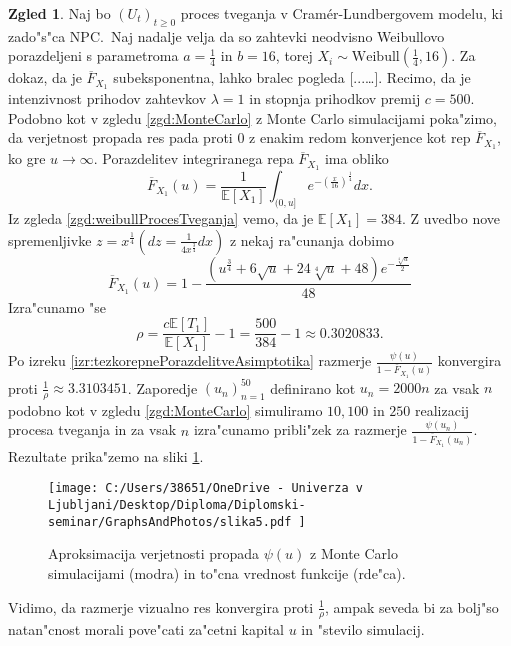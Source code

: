 \documentclass[12pt, a4paper, reqno]{amsart}
\theoremstyle{definition}
\newtheorem{zgled}[definicija]{Zgled}
\theoremstyle{plain}
\newcommand{\E}{\mathbb{E}}
\newcommand{\1}{\mathds{1}}
\begin{document}
        \begin{zgled}
        Naj bo $(U_t)_{t\geq0}$ proces tveganja v Cramér-Lundbergovem modelu, ki zado"s"ca NPC.\ Naj 
        nadalje velja da so zahtevki neodvisno Weibullovo porazdeljeni s parametroma
        $a= \frac{1}{4}$ in $b= 16$, torej $X_i\sim\text{Weibull}(\frac{1}{4}, 16)$. 
        Za dokaz, da je $\overline{F}_{X_1}$ subeksponentna, lahko bralec pogleda [...\dots].
        Recimo, da je intenzivnost 
        prihodov zahtevkov $\lambda = 1$ in stopnja prihodkov premij $c = 500$.
        Podobno kot v zgledu \ref{zgd:MonteCarlo} z Monte Carlo simulacijami poka"zimo, da 
        verjetnost propada res pada proti $0$
        z enakim redom konverjence kot rep $\overline{F}_{X_1}$, ko gre $u\to\infty$. 
        Porazdelitev integriranega repa $\overline{F}_{X_1}$ ima obliko
        \begin{equation*}
            \overline{F}_{X_1}(u) = \frac{1}{\E\left[X_1\right]}\int_{(0, u]}e^{-\left(\tfrac{x}{16}\right)^{\tfrac{1}{4}}}dx.
        \end{equation*}
        Iz zgleda \ref{zgd:weibullProcesTveganja} vemo, da je $\E\left[X_1\right] = 384$. Z uvedbo nove spremenljivke
        $z = x^{\tfrac{1}{4}} (dz = \frac{1}{4x^\frac{3}{4}}dx)$ z nekaj ra"cunanja dobimo 
        \begin{equation*}
            \overline{F}_{X_1}(u) = 1 - \frac{\left(u^{\frac{3}{4}} + 6 \sqrt{u} + 24 \sqrt[4]{u} + 48\right)e^{-\frac{\sqrt[4]{u}}{2}}}{48}
        \end{equation*}
        Izra"cunamo "se 
        \begin{equation*}
        \rho = \frac{c \E\left[T_1\right]}{\E\left[X_1\right]} - 1 = \frac{500}{384} - 1 \approx 0.3020833.
        \end{equation*}
        Po izreku \ref{izr:tezkorepnePorazdelitveAsimptotika} razmerje $\tfrac{\psi(u)}{1 - \overline{F}_{X_1}(u)}$ konvergira proti $\tfrac{1}{\rho} \approx 3.3103451$.
        Zaporedje $(u_n)_{n = 1}^{50}$ definirano kot $u_n = 2000n$ za vsak $n$ podobno kot v zgledu \ref{zgd:MonteCarlo} simuliramo $10, 100$ in $250$ realizacij
        procesa tveganja in za vsak $n$ izra"cunamo pribli"zek za razmerje $\tfrac{\psi(u_n)}{1 - \overline{F}_{X_1}(u_n)}$.
        Rezultate prika"zemo na sliki \ref{fig:slika5}.
       
        \begin{figure}[H]
            \centering
            \texttt{[image: 
                C:/Users/38651/OneDrive - Univerza v Ljubljani/Desktop/Diploma/Diplomski-seminar/GraphsAndPhotos/slika5.pdf
                ]}
            \caption{Aproksimacija verjetnosti propada $\psi(u)$ z Monte Carlo simulacijami (modra) in 
            to"cna vrednost funkcije (rde"ca).}
            \label{fig:slika5}
        \end{figure}

        \noindent
        Vidimo, da razmerje vizualno res konvergira proti $\tfrac{1}{\rho}$, ampak seveda bi 
        za bolj"so natan"cnost morali pove"cati za"cetni kapital $u$ in "stevilo simulacij. 
        \label{zg:MonteCarloTezkiRepi}
        \end{zgled}
\end{document}
